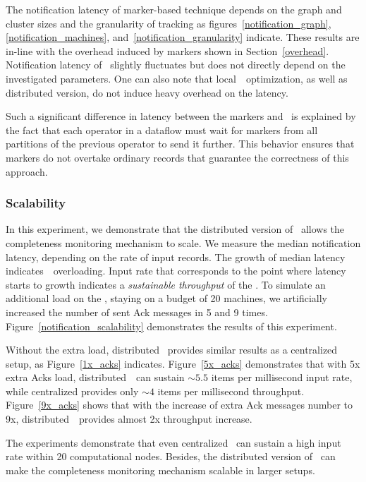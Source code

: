 The notification latency of marker-based technique depends on the graph and cluster sizes and the granularity of tracking as figures~\ref{notification_graph},\ref{notification_machines}, and~\ref{notification_granularity} indicate. These results are in-line with the overhead induced by markers shown in Section~\ref{overhead}. Notification latency of \tracker\ slightly fluctuates but does not directly depend on the investigated parameters. One can also note that local~\tracker\ optimization, as well as distributed version, do not induce heavy overhead on the latency.

Such a significant difference in latency between the markers and \tracker\ is explained by the fact that each operator in a dataflow must wait for markers from all partitions of the previous operator to send it further. This behavior ensures that markers do not overtake ordinary records that guarantee the correctness of this approach.

\subsubsection{Scalability}

In this experiment, we demonstrate that the distributed version of \tracker\ allows the completeness monitoring mechanism to scale. We measure the median notification latency, depending on the rate of input records. The growth of median latency indicates~\tracker\ overloading. Input rate that corresponds to the point where latency starts to growth indicates a {\em sustainable throughput} of the \tracker . To simulate an additional load on the \tracker , staying on a budget of 20 machines, we artificially increased the number of sent Ack messages in 5 and 9 times. Figure~\ref{notification_scalability} demonstrates the results of this experiment.

Without the extra load, distributed \tracker\ provides similar results as a centralized setup, as Figure~\ref{1x_acks} indicates. Figure~\ref{5x_acks} demonstrates that with 5x extra Acks load, distributed~\tracker\ can sustain $\sim 5.5$ items per millisecond input rate, while centralized provides only $\sim 4$ items per millisecond throughput. Figure~\ref{9x_acks} shows that with the increase of extra Ack messages number to 9x, distributed~\tracker\ provides almost 2x throughput increase. 

The experiments demonstrate that even centralized \tracker\ can sustain a high input rate within 20 computational nodes. Besides, the distributed version of \tracker\ can make the completeness monitoring mechanism scalable in larger setups.

